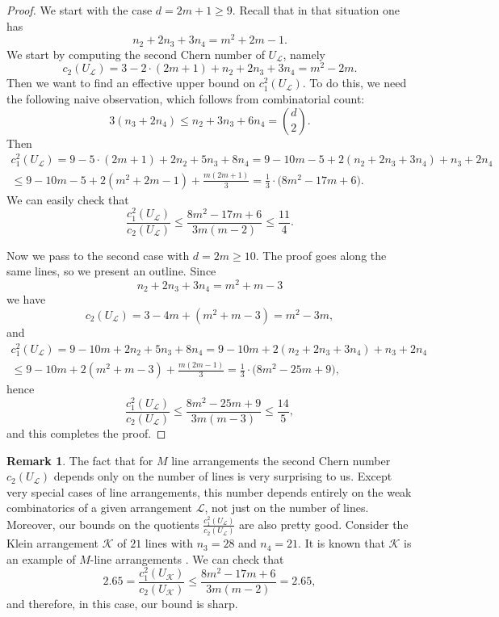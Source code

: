\documentclass[12pt]{article}
\theoremstyle{plain}
\theoremstyle{definition}
\newtheorem{remark}[thm]{Remark}
\begin{document}
\begin{proof}
We start with the case $d=2m+1\geq 9$. Recall that in that situation one has
$$n_{2} + 2n_{3} + 3n_{4} = m^{2}+2m-1.$$
We start by computing the second Chern number of $U_{\mathcal{L}}$, namely
$$c_{2}(U_{\mathcal{L}}) = 3-2\cdot(2m+1) +n_{2} + 2n_{3} + 3n_{4} = m^2-2m.$$
Then we want to find an effective upper bound on $c_{1}^{2}(U_{\mathcal{L}})$. To do this, we need the following naive observation, which follows from combinatorial count:
\begin{equation}
\label{naive}
3(n_{3}+2n_{4}) \leq n_{2} + 3n_{3} + 6n_{4} = \binom{d}{2}.
\end{equation}
Then
\begin{multline*}
c_{1}^{2}(U_{\mathcal{L}}) = 9 - 5\cdot(2m+1) + 2n_{2} + 5n_{3} + 8n_{4} = 9-10m-5 + 2(n_{2}+2n_{3}+3n_{4}) + n_{3}+2n_{4} \\ \leq9-10m-5+2(m^{2}+2m-1)+\frac{m(2m+1)}{3} = \frac{1}{3}\cdot \bigg(8m^{2}-17m+6\bigg).  
\end{multline*}
We can easily check that 
$$\dfrac{c_{1}^{2}(U_{\mathcal{L}})}{c_{2}(U_{\mathcal{L}})} \leq \frac{8m^{2}-17m+6}{3m(m-2)} \leq \frac{11}{4}.$$

Now we pass to the second case with $d=2m\geq 10$. The proof goes along the same lines, so we present an outline. Since 
$$n_{2}+2n_{3}+3n_{4} = m^{2}+m-3$$
we have 
$$c_{2}(U_{\mathcal{L}}) = 3 - 4m + (m^{2}+m-3) = m^{2}-3m,$$
and 
\begin{multline*}
c_{1}^{2}(U_{\mathcal{L}}) = 9 - 10m+ 2n_{2} + 5n_{3} + 8n_{4} = 9-10m + 2(n_{2}+2n_{3}+3n_{4}) + n_{3}+2n_{4} \\ \leq 9-10m + 2(m^{2}+m-3)+\frac{m(2m-1)}{3} = \frac{1}{3}\cdot \bigg(8m^{2}-25m+9\bigg), 
\end{multline*}
hence
$$\dfrac{c_{1}^{2}(U_{\mathcal{L}})}{c_{2}(U_{\mathcal{L}})} \leq \frac{8m^{2}-25m+9}{3m(m-3)} \leq \frac{14}{5},$$
and this completes the proof.
\end{proof}
\begin{remark}
The fact that for $M$ line arrangements the second Chern number $c_{2}(U_{\mathcal{L}})$ depends only on the number of lines is very surprising to us. Except very special cases of line arrangements, this number depends entirely on the weak combinatorics of a given arrangement $\mathcal{L}$, not just on the number of lines. Moreover, our bounds on the quotients $\frac{c_{1}^{2}(U_{\mathcal{L}})}{c_{2}(U_{\mathcal{L}})}$ are also pretty good. Consider the Klein arrangement $\mathcal{K}$ of $21$ lines with $n_{3}=28$ and $n_{4}=21$. It is known that $\mathcal{K}$ is an example of $M$-line arrangements \cite{JanLes}. We can check that
$$2.65= \dfrac{c_{1}^{2}(U_{\mathcal{K}})}{c_{2}(U_{\mathcal{K}})} \leq \frac{8m^{2}-17m+6}{3m(m-2)} = 2.65,$$
and therefore, in this case, our bound is sharp. 
\end{remark}
\end{document}
